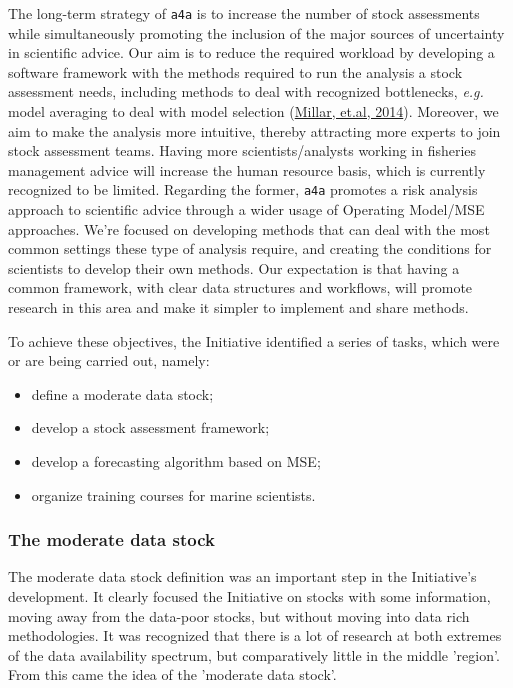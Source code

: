\documentclass[a4paper,english,10pt]{article}\usepackage[]{graphicx}\usepackage[]{color}
\newcommand{\initiative}[1]{{\texttt{#1}}}
\begin{document}
The long-term strategy of \initiative{a4a} is to increase the number of stock assessments while simultaneously promoting the inclusion of the major sources of uncertainty in scientific advice. Our aim is to reduce the required workload by developing a software framework with the methods required to run the analysis a stock assessment needs, including methods to deal with recognized bottlenecks, \emph{e.g.} model averaging to deal with model selection (\href{http://icesjms.oxfordjournals.org/content/early/2014/03/31/icesjms.fsu043.abstract}{Millar, et.al, 2014}). Moreover, we aim to make the analysis more intuitive, thereby attracting more experts to join stock assessment teams. Having more scientists/analysts working in fisheries management advice will increase the human resource basis, which is currently recognized to be limited. Regarding the former, \initiative{a4a} promotes a risk analysis approach to scientific advice through a wider usage of Operating Model/MSE approaches. We're focused on developing methods that can deal with the most common settings these type of analysis require, and creating the conditions for scientists to develop their own methods. Our expectation is that having a common framework, with clear data structures and workflows, will promote research in this area and make it simpler to implement and share methods.

To achieve these objectives, the Initiative identified a series of tasks, which were or are being carried out, namely:
\begin{itemize}
	\item define a moderate data stock;
	\item develop a stock assessment framework;
	\item develop a forecasting algorithm based on MSE;
	\item organize training courses for marine scientists.
\end{itemize}

\subsubsection{The moderate data stock}

The moderate data stock definition was an important step in the Initiative's development. It clearly focused the Initiative on stocks with some information, moving away from the data-poor stocks, but without moving into data rich methodologies. It was recognized that there is a lot of research at both extremes of the data availability spectrum, but comparatively little in the middle 'region'. From this came the idea of the 'moderate data stock'. 
\end{document}

